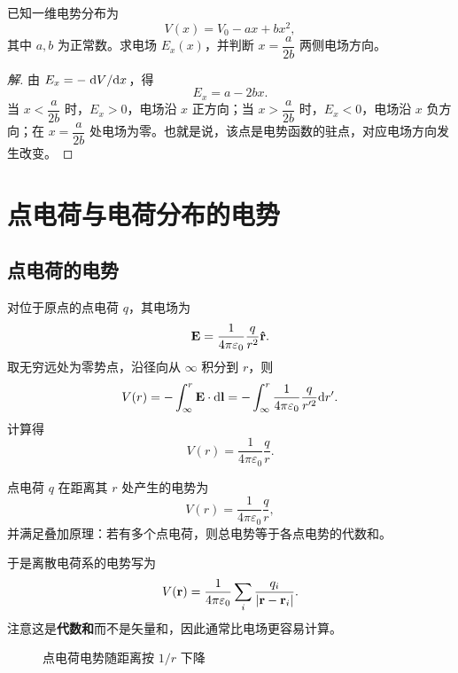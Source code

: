 \begin{example}
已知一维电势分布为
\[
V(x)=V_0-ax+bx^2,
\]
其中 $a,b$ 为正常数。求电场 $E_x(x)$，并判断 $x=\dfrac{a}{2b}$ 两侧电场方向。
\end{example}

\begin{proof}[解]
由 $E_x=-\dv*{V}{x}$，得
\[
E_x=a-2bx.
\]
当 $x<\dfrac{a}{2b}$ 时，$E_x>0$，电场沿 $x$ 正方向；当 $x>\dfrac{a}{2b}$ 时，$E_x<0$，电场沿 $x$ 负方向；在 $x=\dfrac{a}{2b}$ 处电场为零。也就是说，该点是电势函数的驻点，对应电场方向发生改变。
\end{proof}

\section{点电荷与电荷分布的电势}

\subsection{点电荷的电势}

对位于原点的点电荷 $q$，其电场为
\[
\vb E=\frac{1}{4\pi\varepsilon_0}\frac{q}{r^2}\vu{r}.
\]
取无穷远处为零势点，沿径向从 $\infty$ 积分到 $r$，则
\[
V(r)=-\int_\infty^r \vb E\cdot \dd\vb l
=-\int_\infty^r \frac{1}{4\pi\varepsilon_0}\frac{q}{r'^2}\dd r'.
\]
计算得
\[
V(r)=\frac{1}{4\pi\varepsilon_0}\frac{q}{r}.
\]

\begin{law}
点电荷 $q$ 在距离其 $r$ 处产生的电势为
\[
V(r)=\frac{1}{4\pi\varepsilon_0}\frac{q}{r},
\]
并满足叠加原理：若有多个点电荷，则总电势等于各点电势的代数和。
\end{law}

于是离散电荷系的电势写为
\[
V(\vb r)=\frac{1}{4\pi\varepsilon_0}\sum_i \frac{q_i}{\abs{\vb r-\vb r_i}}.
\]
注意这是\textbf{代数和}而不是矢量和，因此通常比电场更容易计算。

\begin{figure}[htbp]
\centering
{}
\caption{点电荷电势随距离按 $1/r$ 下降}
\end{figure}

